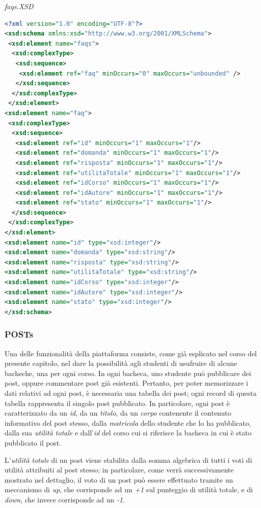 \documentclass [a4paper,11pt]{book}
\begin{document}
\medskip

\emph{faqs.XSD}

\begin{lstlisting}[language=XML]
<?xml version="1.0" encoding="UTF-8"?>
<xsd:schema xmlns:xsd="http://www.w3.org/2001/XMLSchema">
 <xsd:element name="faqs">
  <xsd:complexType>
   <xsd:sequence>
    <xsd:element ref="faq" minOccurs="0" maxOccurs="unbounded" />
   </xsd:sequence>
  </xsd:complexType>
 </xsd:element>
<xsd:element name="faq">
 <xsd:complexType>
  <xsd:sequence>
   <xsd:element ref="id" minOccurs="1" maxOccurs="1"/>
   <xsd:element ref="domanda" minOccurs="1" maxOccurs="1"/>
   <xsd:element ref="risposta" minOccurs="1" maxOccurs="1"/>
   <xsd:element ref="utilitaTotale" minOccurs="1" maxOccurs="1"/>
   <xsd:element ref="idCorso" minOccurs="1" maxOccurs="1"/>
   <xsd:element ref="idAutore" minOccurs="1" maxOccurs="1"/>
   <xsd:element ref="stato" minOccurs="1" maxOccurs="1"/>
  </xsd:sequence>
 </xsd:complexType>
</xsd:element>
<xsd:element name="id" type="xsd:integer"/>
<xsd:element name="domanda" type="xsd:string"/>
<xsd:element name="risposta" type="xsd:string"/>
<xsd:element name="utilitaTotale" type="xsd:string"/>
<xsd:element name="idCorso" type="xsd:integer"/>
<xsd:element name="idAutore" type="xsd:integer"/>
<xsd:element name="stato" type="xsd:integer"/>
</xsd:schema>
\end{lstlisting}

\medskip

\subsubsection{POSTs}	%

Una delle funzionalità della piattaforma consiste, come già esplicato nel corso del presente capitolo, nel dare la possibilità agli studenti di usufruire di alcune bacheche, una per ogni corso. In ogni bacheca, uno studente può pubblicare dei post, oppure commentare post già esistenti. Pertanto, per poter memorizzare i dati relativi ad ogni post, è necessaria una tabella dei post; ogni record di questa tabella rappresenta il singolo post pubblicato. In particolare, ogni post è caratterizzato da un \emph{id}, da un \emph{titolo}, da un \emph{corpo} contenente il contenuto informativo del post stesso, dalla \emph{matricola} dello studente che lo ha pubblicato, dalla sua \emph{utilità totale} e dall'\emph{id} del corso cui si riferisce la bacheca in cui è stato pubblicato il post.

L'\emph{utilità totale} di un post viene stabilita dalla somma algebrica di tutti i voti di utilità attribuiti al post stesso; in particolare, come verrà successivamente mostrato nel dettaglio, il voto di un post può essere effettuato tramite un meccanismo di \emph{up}, che corrisponde ad un \emph{+1} sul punteggio di utilità totale, e di \emph{down}, che invece corrisponde ad un \emph{-1}.
\end{document}
